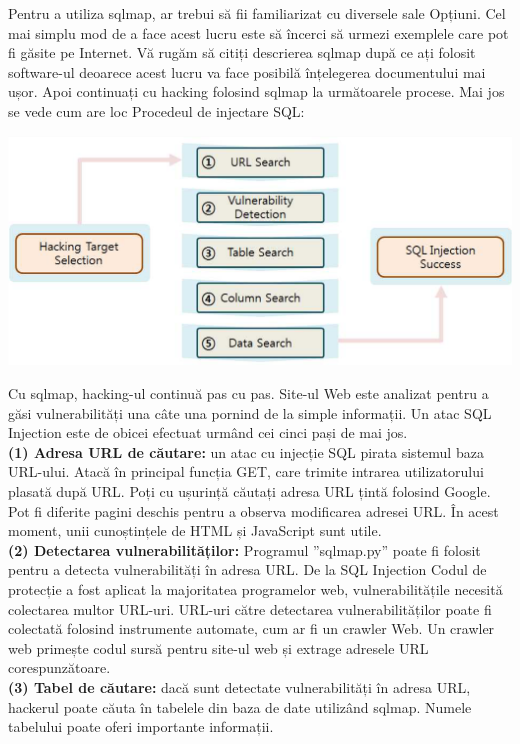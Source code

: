 \documentclass[oneside,20pt]{article}          %
\begin{document}
Pentru a utiliza sqlmap, ar trebui să fii familiarizat cu diversele sale
Opțiuni. Cel mai simplu mod de a face acest lucru este să încerci să urmezi exemplele care
pot fi găsite pe Internet. Vă rugăm să citiți descrierea sqlmap după ce ați folosit software-ul deoarece acest lucru
va face posibilă înțelegerea documentului mai ușor. Apoi continuați cu hacking folosind sqlmap la următoarele
procese. Mai jos se vede cum are loc Procedeul de injectare SQL:\\
\begin{center}
\includegraphics[height = 5 cm]{7.png}
\end{center}
Cu sqlmap, hacking-ul continuă pas cu pas. Site-ul Web este
analizat pentru a găsi vulnerabilități una câte una pornind de la simple
informații. Un atac SQL Injection este de obicei efectuat urmând cei cinci pași de mai jos.\\
\textbf{(1) Adresa URL de căutare:} un atac cu injecție SQL pirata sistemul
baza URL-ului. Atacă în principal funcția GET,
care trimite intrarea utilizatorului plasată după URL. Poți cu ușurință
căutați adresa URL țintă folosind Google. Pot fi diferite pagini
deschis pentru a observa modificarea adresei URL. În acest moment, unii
cunoștințele de HTML și JavaScript sunt utile.\\
\textbf{(2) Detectarea vulnerabilităților:} Programul ”sqlmap.py” poate fi
folosit pentru a detecta vulnerabilități în adresa URL. De la SQL Injection
Codul de protecție a fost aplicat la majoritatea programelor web,
vulnerabilitățile necesită colectarea multor URL-uri. URL-uri către
detectarea vulnerabilităților poate fi colectată folosind instrumente automate,
cum ar fi un crawler Web. Un crawler web primește codul sursă
pentru site-ul web și extrage adresele URL corespunzătoare.\\
\textbf{(3) Tabel de căutare:} dacă sunt detectate vulnerabilități în adresa URL,
hackerul poate căuta în tabelele din baza de date utilizând
sqlmap. Numele tabelului poate oferi importante informații.\\
\end{document}
